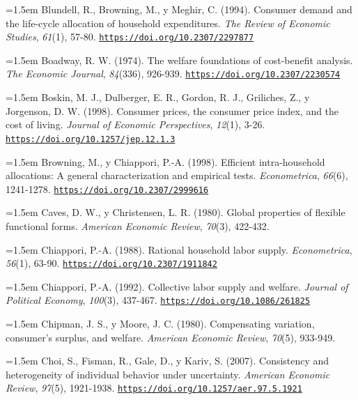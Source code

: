\documentclass[10pt,a4paper]{article}
\begin{document}
\noindent\hangindent=1.5em Blundell, R., Browning, M., y Meghir, C. (1994). Consumer demand and the life-cycle allocation of household expenditures. \textit{The Review of Economic Studies}, \textit{61}(1), 57-80. \href{https://doi.org/10.2307/2297877}{\nolinkurl{https://doi.org/10.2307/2297877}}

\noindent\hangindent=1.5em Boadway, R. W. (1974). The welfare foundations of cost-benefit analysis. \textit{The Economic Journal}, \textit{84}(336), 926-939. \href{https://doi.org/10.2307/2230574}{\nolinkurl{https://doi.org/10.2307/2230574}}

\noindent\hangindent=1.5em Boskin, M. J., Dulberger, E. R., Gordon, R. J., Griliches, Z., y Jorgenson, D. W. (1998). Consumer prices, the consumer price index, and the cost of living. \textit{Journal of Economic Perspectives}, \textit{12}(1), 3-26. \href{https://doi.org/10.1257/jep.12.1.3}{\nolinkurl{https://doi.org/10.1257/jep.12.1.3}}

\noindent\hangindent=1.5em Browning, M., y Chiappori, P.-A. (1998). Efficient intra-household allocations: A general characterization and empirical tests. \textit{Econometrica}, \textit{66}(6), 1241-1278. \href{https://doi.org/10.2307/2999616}{\nolinkurl{https://doi.org/10.2307/2999616}}

\noindent\hangindent=1.5em Caves, D. W., y Christensen, L. R. (1980). Global properties of flexible functional forms. \textit{American Economic Review}, \textit{70}(3), 422-432.

\noindent\hangindent=1.5em Chiappori, P.-A. (1988). Rational household labor supply. \textit{Econometrica}, \textit{56}(1), 63-90. \href{https://doi.org/10.2307/1911842}{\nolinkurl{https://doi.org/10.2307/1911842}}

\noindent\hangindent=1.5em Chiappori, P.-A. (1992). Collective labor supply and welfare. \textit{Journal of Political Economy}, \textit{100}(3), 437-467. \href{https://doi.org/10.1086/261825}{\nolinkurl{https://doi.org/10.1086/261825}}

\noindent\hangindent=1.5em Chipman, J. S., y Moore, J. C. (1980). Compensating variation, consumer's surplus, and welfare. \textit{American Economic Review}, \textit{70}(5), 933-949.

\noindent\hangindent=1.5em Choi, S., Fisman, R., Gale, D., y Kariv, S. (2007). Consistency and heterogeneity of individual behavior under uncertainty. \textit{American Economic Review}, \textit{97}(5), 1921-1938. \href{https://doi.org/10.1257/aer.97.5.1921}{\nolinkurl{https://doi.org/10.1257/aer.97.5.1921}}
\end{document}
